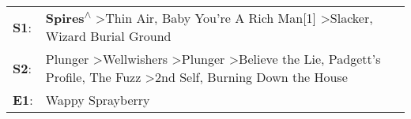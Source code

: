 \begin{supertabular}{p{0.03\textwidth}p{0.92\textwidth}}
 \textbf{S1}:  &                                                                                                                             \textbf{Spires\textsuperscript{$\wedge$}} \textgreater \enspace Thin Air\textsuperscript{}, \enspace Baby You're A Rich Man[1]\textsuperscript{} \textgreater \enspace Slacker\textsuperscript{}, \enspace Wizard Burial Ground\textsuperscript{}  \enspace  \\
 \textbf{S2}:  &  Plunger\textsuperscript{} \textgreater \enspace Wellwishers\textsuperscript{} \textgreater \enspace Plunger\textsuperscript{} \textgreater \enspace Believe the Lie\textsuperscript{}, \enspace Padgett's Profile\textsuperscript{}, \enspace The Fuzz\textsuperscript{} \textgreater \enspace 2nd Self\textsuperscript{}, \enspace Burning Down the House\textsuperscript{}  \enspace  \\
 \textbf{E1}:  &                                                                                                                                                                                                                                                                                                                                            Wappy Sprayberry\textsuperscript{}  \enspace  \\
\end{supertabular}
